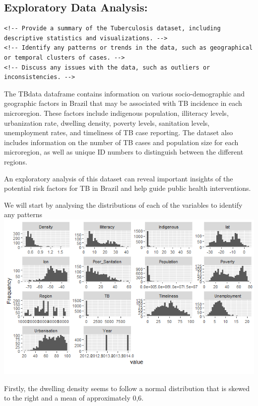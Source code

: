 \documentclass[
  letterpaper,
  DIV=11,
  numbers=noendperiod]{scrartcl}
\begin{document}
\hypertarget{exploratory-data-analysis}{%
\subsection{Exploratory Data
Analysis:}\label{exploratory-data-analysis}}

\begin{verbatim}
<!-- Provide a summary of the Tuberculosis dataset, including descriptive statistics and visualizations. -->
<!-- Identify any patterns or trends in the data, such as geographical or temporal clusters of cases. -->
<!-- Discuss any issues with the data, such as outliers or inconsistencies. -->
\end{verbatim}

The TBdata dataframe contains information on various socio-demographic
and geographic factors in Brazil that may be associated with TB
incidence in each microregion. These factors include indigenous
population, illiteracy levels, urbanization rate, dwelling density,
poverty levels, sanitation levels, unemployment rates, and timeliness of
TB case reporting. The dataset also includes information on the number
of TB cases and population size for each microregion, as well as unique
ID numbers to distinguish between the different regions.

An exploratory analysis of this dataset can reveal important insights of
the potential risk factors for TB in Brazil and help guide public health
interventions.

We will start by analysing the distributions of each of the variables to
identify any patterns \includegraphics{histogramExploratoryAnalysis.png}

Firstly, the dwelling density seems to follow a normal distribution that
is skewed to the right and a mean of approximately 0,6.
\end{document}
